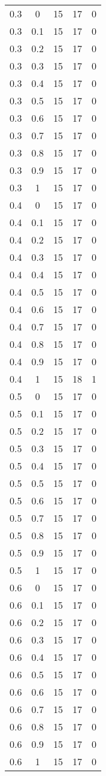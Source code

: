 \begin{longtable}{|c|c|c|c|c|}
	0.3& 0& 15& 17& 0 \\
	0.3& 0.1& 15& 17& 0 \\
	0.3& 0.2& 15& 17& 0 \\
	0.3& 0.3& 15& 17& 0 \\
	0.3& 0.4& 15& 17& 0 \\
	0.3& 0.5& 15& 17& 0 \\
	0.3& 0.6& 15& 17& 0 \\
	0.3& 0.7& 15& 17& 0 \\
	0.3& 0.8& 15& 17& 0 \\
	0.3& 0.9& 15& 17& 0 \\
	0.3& 1& 15& 17& 0 \\
	\hline
	
	0.4& 0& 15& 17& 0 \\
	0.4& 0.1& 15& 17& 0 \\
	0.4& 0.2& 15& 17& 0 \\
	0.4& 0.3& 15& 17& 0 \\
	0.4& 0.4& 15& 17& 0 \\
	0.4& 0.5& 15& 17& 0 \\
	0.4& 0.6& 15& 17& 0 \\
	0.4& 0.7& 15& 17& 0 \\
	0.4& 0.8& 15& 17& 0 \\
	0.4& 0.9& 15& 17& 0 \\
	0.4& 1& 15& 18& 1 \\
	\hline
	
	0.5& 0& 15& 17& 0 \\
	0.5& 0.1& 15& 17& 0 \\
	0.5& 0.2& 15& 17& 0 \\
	0.5& 0.3& 15& 17& 0 \\
	0.5& 0.4& 15& 17& 0 \\
	0.5& 0.5& 15& 17& 0 \\
	0.5& 0.6& 15& 17& 0 \\
	0.5& 0.7& 15& 17& 0 \\
	0.5& 0.8& 15& 17& 0 \\
	0.5& 0.9& 15& 17& 0 \\
	0.5& 1& 15& 17& 0 \\
	\hline
	
	0.6& 0& 15& 17& 0 \\
	0.6& 0.1& 15& 17& 0 \\
	0.6& 0.2& 15& 17& 0 \\
	0.6& 0.3& 15& 17& 0 \\
	0.6& 0.4& 15& 17& 0 \\
	0.6& 0.5& 15& 17& 0 \\
	0.6& 0.6& 15& 17& 0 \\
	0.6& 0.7& 15& 17& 0 \\
	0.6& 0.8& 15& 17& 0 \\
	0.6& 0.9& 15& 17& 0 \\
	0.6& 1& 15& 17& 0 \\
	\hline
	

\end{longtable}
